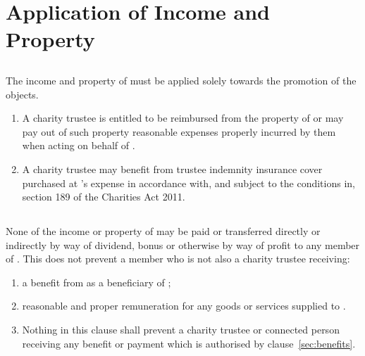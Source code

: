 \section{Application of Income and Property}
\label{sec:income}
    \subsection{}The income and property of \shortname{} must be applied solely towards the promotion of the objects.
    \begin{enumerate}
        \item A charity trustee is entitled to be reimbursed from the property of \shortname{} or may pay out of such property reasonable expenses properly incurred by them when acting on behalf of \shortname{}.
        \item A charity trustee may benefit from trustee indemnity insurance cover purchased at \shortname{}'s expense in accordance with, and subject to the conditions in, section 189 of the Charities Act 2011.
    \end{enumerate}

    \subsection{}None of the income or property of \shortname{} may be paid or transferred directly or indirectly by way of dividend, bonus or otherwise by way of profit to any member of \shortname{}. This does not prevent a member who is not also a charity trustee receiving:
    \begin{enumerate}
        \item a benefit from \shortname{} as a beneficiary of \shortname{};
        \item reasonable and proper remuneration for any goods or services supplied to \shortname{}.
        \item Nothing in this clause shall prevent a charity trustee or connected person receiving any benefit or payment which is authorised by clause~\ref{sec:benefits}.
    \end{enumerate}
